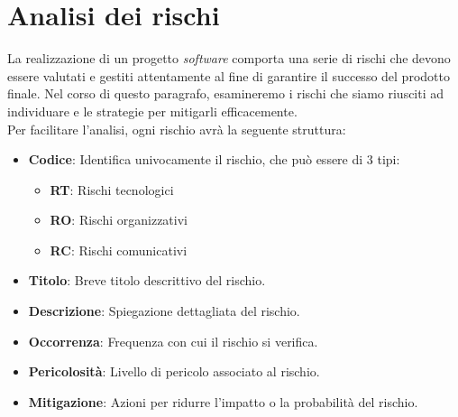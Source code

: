 \documentclass[5pt]{article}
\begin{document}
\section{Analisi dei rischi}
La realizzazione di un progetto \textit{software} comporta una serie di rischi che devono essere valutati e gestiti attentamente al fine di garantire il successo del prodotto finale. Nel corso di questo paragrafo, esamineremo i rischi che siamo riusciti ad individuare e le strategie per mitigarli efficacemente. \\[1\baselineskip]
Per facilitare l'analisi, ogni rischio avrà la seguente struttura:
\begin{itemize}
  \item \textbf{Codice}: Identifica univocamente il rischio, che può essere di 3 tipi:
      \begin{itemize}
      \item \textbf{RT}: Rischi tecnologici
      \item \textbf{RO}: Rischi organizzativi
      \item \textbf{RC}: Rischi comunicativi
      \end{itemize}
  \item \textbf{Titolo}: Breve titolo descrittivo del rischio.
  \item \textbf{Descrizione}: Spiegazione dettagliata del rischio.
  \item \textbf{Occorrenza}: Frequenza con cui il rischio si verifica.
  \item \textbf{Pericolosità}: Livello di pericolo associato al rischio.
  \item \textbf{Mitigazione}: Azioni per ridurre l'impatto o la probabilità del rischio.
\end{itemize}
\end{document}
